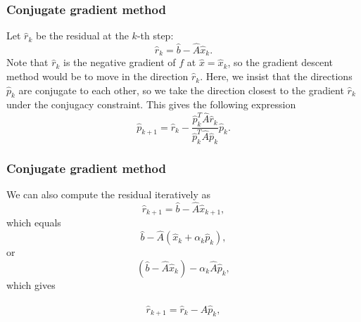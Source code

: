 \documentclass{beamer}
\begin{document}
\begin{frame}
\frametitle{Conjugate gradient method}

\begin{block}{}
Let  $\hat{r}_k$ be the residual at the $k$-th step:
\begin{equation*}
\hat{r}_k=\hat{b}-\hat{A}\hat{x}_k.
\end{equation*}
Note that $\hat{r}_k$ is the negative gradient of $f$ at 
$\hat{x}=\hat{x}_k$, 
so the gradient descent method would be to move in the direction $\hat{r}_k$. 
Here, we insist that the directions $\hat{p}_k$ are conjugate to each other, 
so we take the direction closest to the gradient $\hat{r}_k$  
under the conjugacy constraint. 
This gives the following expression
\begin{equation*}
\hat{p}_{k+1}=\hat{r}_k-\frac{\hat{p}_k^T \hat{A}\hat{r}_k}{\hat{p}_k^T\hat{A}\hat{p}_k} \hat{p}_k.
\end{equation*}
\end{block}
\end{frame}

\begin{frame}
\frametitle{Conjugate gradient method}

\begin{block}{}
We can also  compute the residual iteratively as
\begin{equation*}
\hat{r}_{k+1}=\hat{b}-\hat{A}\hat{x}_{k+1},
 \end{equation*}
which equals
\begin{equation*}
\hat{b}-\hat{A}(\hat{x}_k+\alpha_k\hat{p}_k),
 \end{equation*}
or
\begin{equation*}
(\hat{b}-\hat{A}\hat{x}_k)-\alpha_k\hat{A}\hat{p}_k,
 \end{equation*}
which gives

\begin{equation*}
\hat{r}_{k+1}=\hat{r}_k-\hat{A}\hat{p}_{k},
 \end{equation*}
\end{block}
\end{frame}
\end{document}
